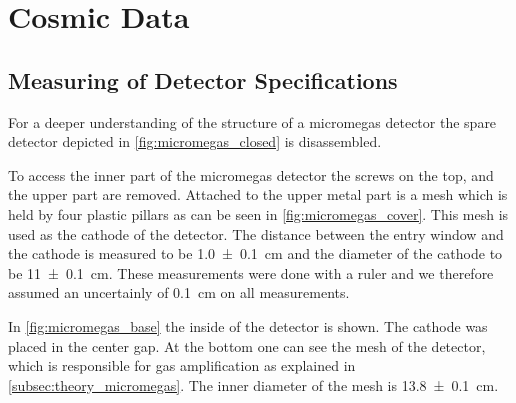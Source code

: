 \documentclass[sn-mathphys-num,iicol]{sn-jnl}
\theoremstyle{thmstyleone}
\theoremstyle{thmstyletwo}
\theoremstyle{thmstylethree}
\begin{document}

\section{Cosmic Data}
\subsection{Measuring of Detector Specifications} \label{subsec:detector_specific} %
For a deeper understanding of the structure of a micromegas detector \cite{Micromega} the spare detector depicted in \autoref{fig:micromegas_closed} is disassembled.


To access the inner part of the micromegas detector the screws on the top, and the upper part are removed.
Attached to the upper metal part is a mesh which is held by four plastic pillars as can be seen in \autoref{fig:micromegas_cover}.
This mesh is used as the cathode of the detector. 
The distance between the entry window and the cathode is measured to be \SI{1.0\pm.1}{\centi\meter} and the diameter of the cathode to be \SI{11\pm.1}{\centi\meter}.
These measurements were done with a ruler and we therefore assumed an uncertainly of \SI{.1}{\centi\meter} on all measurements.


In \autoref{fig:micromegas_base} the inside of the detector is shown. 
The cathode was placed in the center gap.
At the bottom one can see the mesh of the detector, which is responsible for gas amplification as explained in \autoref{subsec:theory_micromegas}.
The inner diameter of the mesh is \SI{13.8\pm.1}{\centi\meter}.

\end{document}
